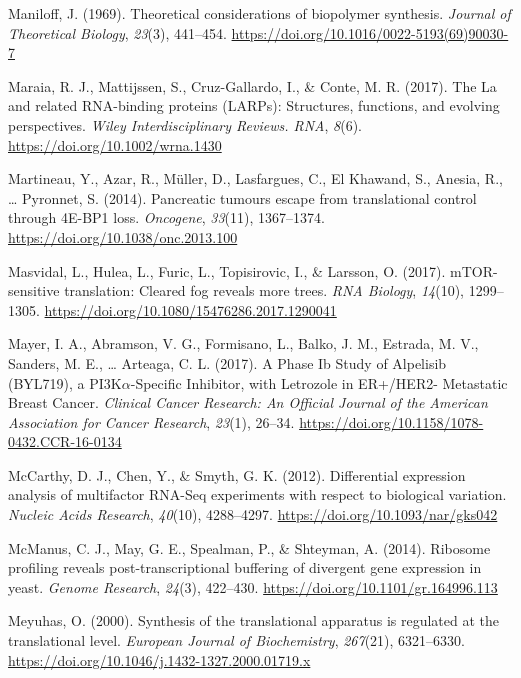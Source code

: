 \documentclass[12pt,openany]{book}
\begin{document}
\hypertarget{ref-Maniloff1969}{}
Maniloff, J. (1969). Theoretical considerations of biopolymer synthesis.
\emph{Journal of Theoretical Biology}, \emph{23}(3), 441--454.
\url{https://doi.org/10.1016/0022-5193(69)90030-7}

\hypertarget{ref-Maraia2017}{}
Maraia, R. J., Mattijssen, S., Cruz-Gallardo, I., \& Conte, M. R.
(2017). The La and related RNA-binding proteins (LARPs): Structures,
functions, and evolving perspectives. \emph{Wiley Interdisciplinary
Reviews. RNA}, \emph{8}(6). \url{https://doi.org/10.1002/wrna.1430}

\hypertarget{ref-Martineau2014}{}
Martineau, Y., Azar, R., Müller, D., Lasfargues, C., El Khawand, S.,
Anesia, R., \ldots{} Pyronnet, S. (2014). Pancreatic tumours escape from
translational control through 4E-BP1 loss. \emph{Oncogene},
\emph{33}(11), 1367--1374. \url{https://doi.org/10.1038/onc.2013.100}

\hypertarget{ref-Masvidal2017}{}
Masvidal, L., Hulea, L., Furic, L., Topisirovic, I., \& Larsson, O.
(2017). mTOR-sensitive translation: Cleared fog reveals more trees.
\emph{RNA Biology}, \emph{14}(10), 1299--1305.
\url{https://doi.org/10.1080/15476286.2017.1290041}

\hypertarget{ref-Mayer2017}{}
Mayer, I. A., Abramson, V. G., Formisano, L., Balko, J. M., Estrada, M.
V., Sanders, M. E., \ldots{} Arteaga, C. L. (2017). A Phase Ib Study of
Alpelisib (BYL719), a PI3K\(\alpha\)-Specific Inhibitor, with Letrozole
in ER+/HER2- Metastatic Breast Cancer. \emph{Clinical Cancer Research:
An Official Journal of the American Association for Cancer Research},
\emph{23}(1), 26--34.
\url{https://doi.org/10.1158/1078-0432.CCR-16-0134}

\hypertarget{ref-McCarthy2012}{}
McCarthy, D. J., Chen, Y., \& Smyth, G. K. (2012). Differential
expression analysis of multifactor RNA-Seq experiments with respect to
biological variation. \emph{Nucleic Acids Research}, \emph{40}(10),
4288--4297. \url{https://doi.org/10.1093/nar/gks042}

\hypertarget{ref-McManus2014}{}
McManus, C. J., May, G. E., Spealman, P., \& Shteyman, A. (2014).
Ribosome profiling reveals post-transcriptional buffering of divergent
gene expression in yeast. \emph{Genome Research}, \emph{24}(3),
422--430. \url{https://doi.org/10.1101/gr.164996.113}

\hypertarget{ref-Meyuhas2000}{}
Meyuhas, O. (2000). Synthesis of the translational apparatus is
regulated at the translational level. \emph{European Journal of
Biochemistry}, \emph{267}(21), 6321--6330.
\url{https://doi.org/10.1046/j.1432-1327.2000.01719.x}
\end{document}

